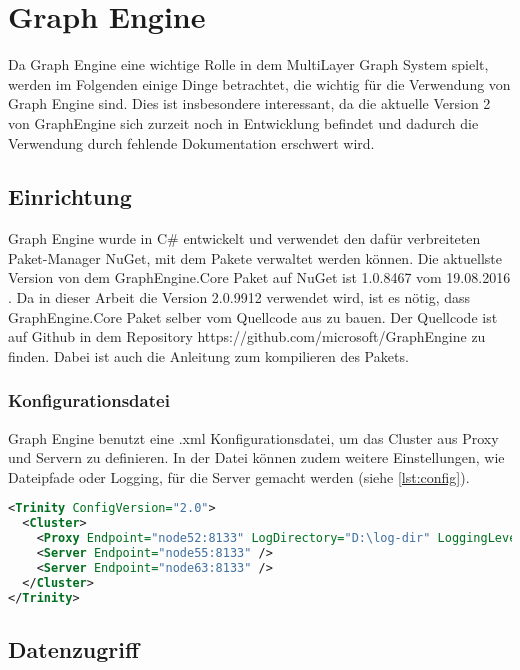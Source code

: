 \section{Graph Engine}

Da Graph Engine eine wichtige Rolle in dem MultiLayer Graph System spielt, werden im Folgenden einige Dinge betrachtet, die wichtig für die Verwendung von Graph Engine sind.
Dies ist insbesondere interessant, da die aktuelle Version 2 von GraphEngine sich zurzeit noch in Entwicklung befindet und dadurch die Verwendung durch fehlende Dokumentation erschwert wird.


\subsection{Einrichtung}

Graph Engine wurde in C\# entwickelt und verwendet den dafür verbreiteten Paket-Manager NuGet, mit dem Pakete verwaltet werden können.
Die aktuellste Version von dem GraphEngine.Core Paket auf NuGet ist 1.0.8467 vom 	19.08.2016 \cite{geVersion}. Da in dieser Arbeit die Version 2.0.9912 verwendet wird, ist es nötig, dass GraphEngine.Core Paket selber vom Quellcode aus zu bauen.
Der Quellcode ist auf Github in dem Repository https://github.com/microsoft/GraphEngine zu finden. Dabei ist auch die Anleitung zum kompilieren des Pakets.


\subsubsection{Konfigurationsdatei}

Graph Engine benutzt eine .xml Konfigurationsdatei, um das Cluster aus Proxy und Servern zu definieren.
In der Datei können zudem weitere Einstellungen, wie Dateipfade oder Logging, für die Server gemacht werden (siehe \ref{lst:config}).

\begin{lstlisting}[language=xml, label={lst:config}, caption={Beispiel Konfigurationsdatei für ein Cluster mit einer Proxy und zwei Servern}]
<Trinity ConfigVersion="2.0">
  <Cluster>
    <Proxy Endpoint="node52:8133" LogDirectory="D:\log-dir" LoggingLevel="Info" />  
    <Server Endpoint="node55:8133" />
    <Server Endpoint="node63:8133" />
  </Cluster>
</Trinity>
\end{lstlisting}


\subsection{Datenzugriff}
\label{datenzugriff}

